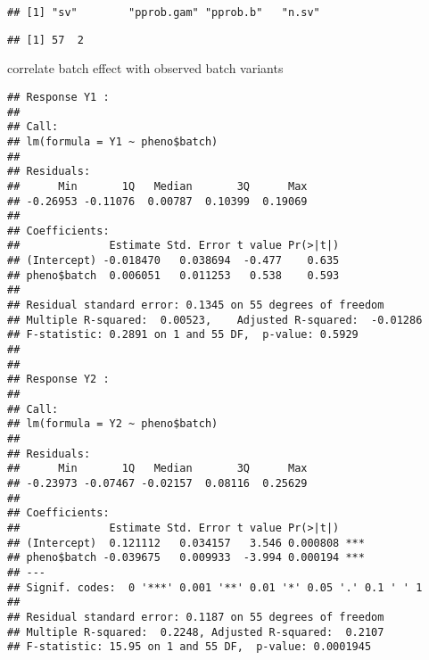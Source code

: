 \documentclass[]{article}
\newenvironment{Shaded}{\begin{snugshade}}{\end{snugshade}}
\newcommand{\KeywordTok}[1]{\textcolor[rgb]{0.13,0.29,0.53}{\textbf{#1}}}
\newcommand{\StringTok}[1]{\textcolor[rgb]{0.31,0.60,0.02}{#1}}
\newcommand{\CommentTok}[1]{\textcolor[rgb]{0.56,0.35,0.01}{\textit{#1}}}
\newcommand{\OperatorTok}[1]{\textcolor[rgb]{0.81,0.36,0.00}{\textbf{#1}}}
\newcommand{\NormalTok}[1]{#1}
\begin{document}
\begin{verbatim}
## [1] "sv"        "pprob.gam" "pprob.b"   "n.sv"
\end{verbatim}

\begin{Shaded}
\end{Shaded}

\begin{verbatim}
## [1] 57  2
\end{verbatim}

correlate batch effect with observed batch variants

\begin{Shaded}
\end{Shaded}

\begin{verbatim}
## Response Y1 :
## 
## Call:
## lm(formula = Y1 ~ pheno$batch)
## 
## Residuals:
##      Min       1Q   Median       3Q      Max 
## -0.26953 -0.11076  0.00787  0.10399  0.19069 
## 
## Coefficients:
##              Estimate Std. Error t value Pr(>|t|)
## (Intercept) -0.018470   0.038694  -0.477    0.635
## pheno$batch  0.006051   0.011253   0.538    0.593
## 
## Residual standard error: 0.1345 on 55 degrees of freedom
## Multiple R-squared:  0.00523,    Adjusted R-squared:  -0.01286 
## F-statistic: 0.2891 on 1 and 55 DF,  p-value: 0.5929
## 
## 
## Response Y2 :
## 
## Call:
## lm(formula = Y2 ~ pheno$batch)
## 
## Residuals:
##      Min       1Q   Median       3Q      Max 
## -0.23973 -0.07467 -0.02157  0.08116  0.25629 
## 
## Coefficients:
##              Estimate Std. Error t value Pr(>|t|)    
## (Intercept)  0.121112   0.034157   3.546 0.000808 ***
## pheno$batch -0.039675   0.009933  -3.994 0.000194 ***
## ---
## Signif. codes:  0 '***' 0.001 '**' 0.01 '*' 0.05 '.' 0.1 ' ' 1
## 
## Residual standard error: 0.1187 on 55 degrees of freedom
## Multiple R-squared:  0.2248, Adjusted R-squared:  0.2107 
## F-statistic: 15.95 on 1 and 55 DF,  p-value: 0.0001945
\end{verbatim}
\end{document}
